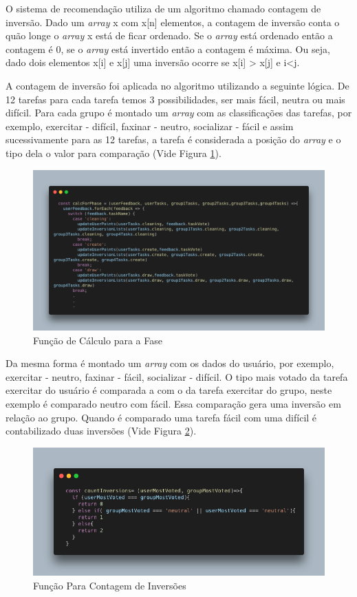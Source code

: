 O sistema de recomendação utiliza de um algoritmo chamado contagem de inversão. 
Dado um \emph{array} x com x[n] elementos, a contagem de inversão conta o quão longe o \emph{array} x está de ficar 
ordenado. Se o \emph{array} está ordenado então a contagem é 0, se o \emph{array} está invertido 
então a contagem é máxima. Ou seja, dado dois elementos x[i] e x[j] uma 
inversão ocorre se x[i] > x[j] e i<j.

A contagem de inversão foi aplicada no algoritmo utilizando a seguinte lógica. 
De 12 tarefas para cada tarefa 
temos 3 possibilidades, ser mais fácil, neutra ou mais difícil. Para cada grupo é montado um \emph{array} 
com as classificações das tarefas, por exemplo, exercitar - difícil, faxinar - neutro, socializar - fácil e assim 
sucessivamente para as 12 tarefas, a tarefa é considerada a posição do \emph{array} 
e o tipo dela o valor para comparação (Vide Figura \ref{fig16}).

\begin{figure}[ht]
    \centering
    \includegraphics[keepaspectratio=true,scale=0.3]{figuras/code-calForPhase.png}
    \caption{Função de Cálculo para a Fase}
        \label{fig16}
\end{figure}

Da mesma forma é montado um \emph{array} com os dados 
do usuário, por exemplo, exercitar - neutro, 
faxinar - fácil, socializar - difícil. O tipo mais votado da tarefa exercitar do usuário é comparada a com o da tarefa 
exercitar do grupo, 
neste exemplo é comparado neutro com fácil. Essa comparação gera uma inversão em relação ao grupo. 
Quando é comparado uma tarefa fácil com uma difícil é contabilizado duas inversões (Vide Figura \ref{fig18}). 

\begin{figure}[ht]
    \centering
    \includegraphics[keepaspectratio=true,scale=0.4]{figuras/code-countInversions.png}
    \caption{Função Para Contagem de Inversões}
        \label{fig18}
\end{figure}

